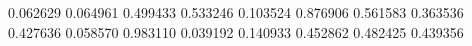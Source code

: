 0.062629   0.064961   0.499433   0.533246
0.103524   0.876906   0.561583   0.363536
0.427636   0.058570   0.983110   0.039192
0.140933   0.452862   0.482425   0.439356

